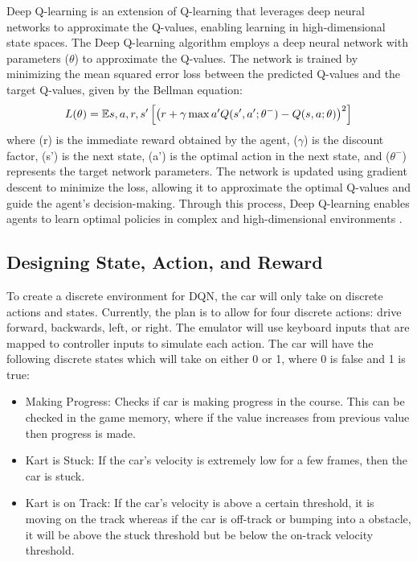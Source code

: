 \documentclass[10pt,twocolumn,letterpaper]{article}
\begin{document}
Deep Q-learning is an extension of Q-learning that leverages deep neural networks to approximate the Q-values, enabling learning in high-dimensional state spaces. The Deep Q-learning algorithm employs a deep neural network with parameters ($\theta$) to approximate the Q-values. The network is trained by minimizing the mean squared error loss between the predicted Q-values and the target Q-values, given by the Bellman equation:
\begin{equation}
    \small L(\theta) = \mathbb{E}{s, a, r, s'}\left[\left(r + \gamma \max{a'} Q(s', a'; \theta^{-}) -  Q(s, a; \theta)\right)^2\right]
\end{equation}
where (r) is the immediate reward obtained by the agent, ($\gamma$) is the discount factor, (s') is the next state, (a') is the optimal action in the next state, and ($\theta^{-}$) represents the target network parameters. The network is updated using gradient descent to minimize the loss, allowing it to approximate the optimal Q-values and guide the agent's decision-making. Through this process, Deep Q-learning enables agents to learn optimal policies in complex and high-dimensional environments \cite{mnih2013playing}.



\subsection{Designing State, Action, and Reward}
To create a discrete environment for DQN, the car will only take on discrete actions and states. Currently, the plan is to allow for four discrete actions: drive forward, backwards, left, or right. The emulator will use keyboard inputs that are mapped to controller inputs to simulate each action. The car will have the following discrete states which will take on either 0 or 1, where 0 is false and 1 is true: 
\begin{itemize}
    \item Making Progress: Checks if car is making progress in the course. This can be checked in the game memory, where if the value increases from previous value then progress is made.
    \item Kart is Stuck: If the car's velocity is extremely low for a few frames, then the car is stuck. 
    \item Kart is on Track: If the car's velocity is above a certain threshold, it is moving on the track whereas if the car is off-track or bumping into a obstacle, it will be above the stuck threshold but be below the on-track velocity threshold. 
\end{itemize}
\end{document}
